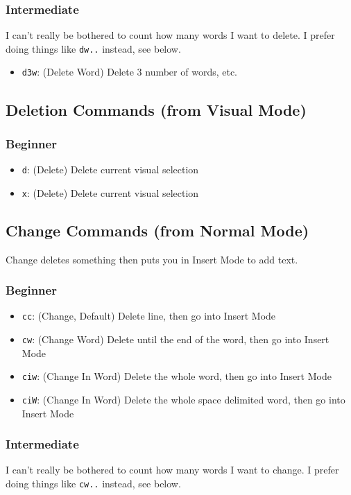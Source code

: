 \documentclass[11pt]{article}
\begin{document}
\subsubsection{Intermediate}
\label{sec:org06b2199}
I can't really be bothered to count how many words I want to delete. I prefer
doing things like \texttt{dw..} instead, see below.
\begin{itemize}
\item \texttt{d3w}: (Delete Word) Delete 3 number of words, etc.
\end{itemize}
\subsection{Deletion Commands (from Visual Mode)}
\label{sec:orgf8e01d8}
\subsubsection{Beginner}
\label{sec:orgf6efb2e}
\begin{itemize}
\item \texttt{d}: (Delete) Delete current visual selection
\item \texttt{x}: (Delete) Delete current visual selection
\end{itemize}
\subsection{Change Commands (from Normal Mode)}
\label{sec:orgd2ce941}
Change deletes something then puts you in Insert Mode to add text.
\subsubsection{Beginner}
\label{sec:org961ced8}
\begin{itemize}
\item \texttt{cc}: (Change, Default) Delete line, then go into Insert Mode
\item \texttt{cw}: (Change Word) Delete until the end of the word, then go into Insert Mode
\item \texttt{ciw}: (Change In Word) Delete the whole word, then go into Insert Mode
\item \texttt{ciW}: (Change In Word) Delete the whole space delimited word, then go into Insert Mode
\end{itemize}
\subsubsection{Intermediate}
\label{sec:orgad928b5}
I can't really be bothered to count how many words I want to change. I prefer
doing things like \texttt{cw..} instead, see below.
\end{document}
